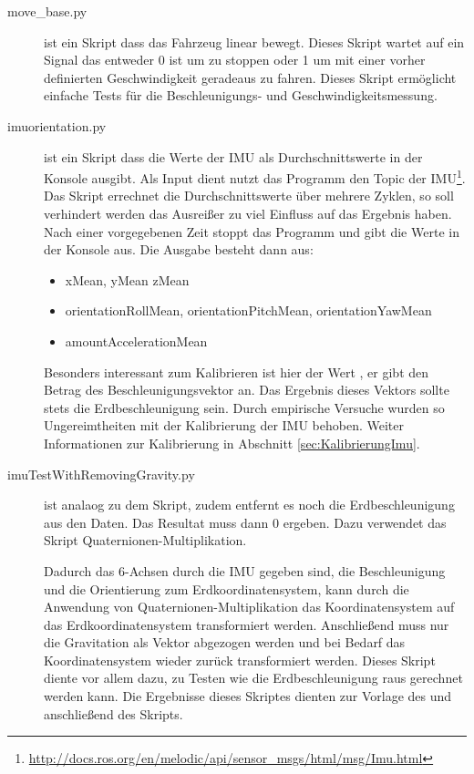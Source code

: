 \begin{description}
\item[move\_base.py]
ist ein Skript dass das Fahrzeug linear bewegt.
Dieses Skript wartet auf ein Signal das entweder 0 ist um zu stoppen oder 1 um
mit einer vorher definierten Geschwindigkeit geradeaus zu fahren.
Dieses Skript ermöglicht einfache Tests für die Beschleunigungs- und Geschwindigkeitsmessung.

\item[imuorientation.py]
ist ein Skript dass die Werte der IMU als Durchschnittswerte in der Konsole ausgibt. Als Input dient nutzt das Programm den Topic der IMU\footnote{\url{http://docs.ros.org/en/melodic/api/sensor_msgs/html/msg/Imu.html}}. Das Skript errechnet die Durchschnittswerte über mehrere Zyklen, so soll verhindert werden das Ausreißer zu viel Einfluss auf das Ergebnis haben. Nach einer vorgegebenen Zeit stoppt das Programm und gibt die Werte in der Konsole aus. Die Ausgabe besteht dann aus:
\begin{itemize}
    \item xMean, yMean zMean
    \item orientationRollMean, orientationPitchMean, orientationYawMean
    \item amountAccelerationMean
\end{itemize}
Besonders interessant zum Kalibrieren ist hier der Wert , er gibt den Betrag des Beschleunigungsvektor an.  
Das Ergebnis dieses Vektors sollte stets die Erdbeschleunigung sein. Durch empirische Versuche wurden so Ungereimtheiten mit der Kalibrierung der IMU behoben. Weiter Informationen zur Kalibrierung in Abschnitt \ref{sec:KalibrierungImu}.

\item[imuTestWithRemovingGravity.py]
ist analaog zu dem  Skript, zudem entfernt es noch die Erdbeschleunigung aus den Daten. Das Resultat muss dann 0 ergeben. Dazu verwendet das Skript Quaternionen-Multiplikation. 



Dadurch das 6-Achsen durch die IMU gegeben sind, die Beschleunigung und die Orientierung zum Erdkoordinatensystem, kann durch die Anwendung von Quaternionen-Multiplikation das Koordinatensystem auf das Erdkoordinatensystem transformiert werden. Anschließend muss nur die Gravitation als Vektor abgezogen werden und bei Bedarf das Koordinatensystem wieder zurück transformiert werden. Dieses Skript diente vor allem dazu, zu Testen wie die Erdbeschleunigung raus gerechnet werden kann. Die Ergebnisse dieses Skriptes dienten zur Vorlage des  und anschließend des  Skripts.


\end{description}
